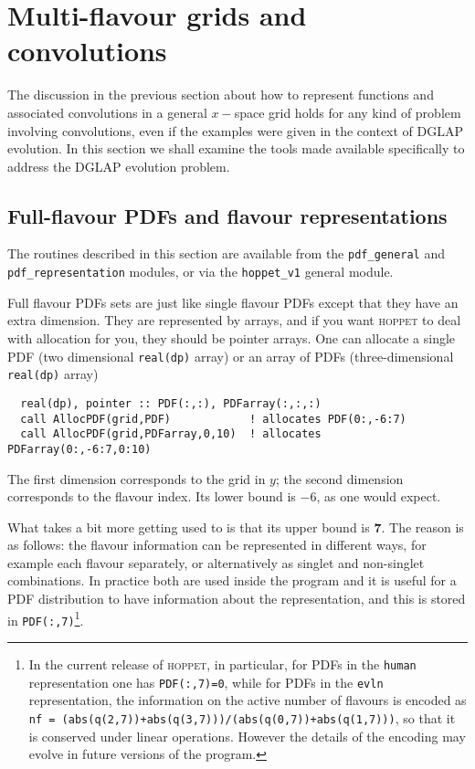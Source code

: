 \documentclass[12pt]{article}
\newcommand{\hoppet}{\textsc{hoppet}\xspace}
\newcommand{\ttt}[1]{\texttt{#1}}
\begin{document}
\section{Multi-flavour grids and convolutions}
\label{sec:dglapstructs}

The discussion in the previous section 
about how to represent functions and associated convolutions
in a general $x-$space grid holds for any kind of problem involving
convolutions, even if the examples were given in the context of DGLAP
evolution. In this section we shall examine the tools made available
specifically to address the DGLAP evolution problem.


\subsection{Full-flavour PDFs and flavour representations}
\label{sec:pdf-objects}

The routines described in this section
 are available from the \ttt{pdf\_general}
and \ttt{pdf\_representation} modules, or via the \ttt{hoppet\_v1}
general module.

Full flavour PDFs sets are just like single flavour PDFs except that they
have an extra dimension. They are represented by arrays, and if you
want \hoppet to deal with allocation for you, they should be pointer
arrays. One can allocate a single PDF (two dimensional
\texttt{real(dp)} array) or an array of PDFs (three-dimensional
\texttt{real(dp)} array)
\begin{lstlisting}
  real(dp), pointer :: PDF(:,:), PDFarray(:,:,:)
  call AllocPDF(grid,PDF)            ! allocates PDF(0:,-6:7)
  call AllocPDF(grid,PDFarray,0,10)  ! allocates PDFarray(0:,-6:7,0:10)
\end{lstlisting}
The first dimension corresponds to the grid in $y$; the second
dimension corresponds to the flavour index. Its lower bound is $-6$,
as one would expect. 

What takes a bit more getting used to is that its
upper bound is \textbf{7}. The reason is as follows: the flavour
information can be represented in different ways, for example each
flavour separately, or alternatively as singlet and non-singlet
combinations. In practice both are used inside the program and it is
useful for a PDF distribution to have information about the
representation, and this is stored in
\texttt{PDF(:,7)}\footnote{
In the current release of \hoppet, 
in particular, for PDFs in the \ttt{human} representation one
has \texttt{PDF(:,7)=0}, while for PDFs in the \ttt{evln}
representation, the information on the active number of flavours
is encoded as
\ttt{nf = (abs(q(2,7))+abs(q(3,7)))/(abs(q(0,7))+abs(q(1,7)))},
so that it is conserved under linear operations.
%
However the details of the encoding may evolve in future
versions of the program.
}.
\end{document}
